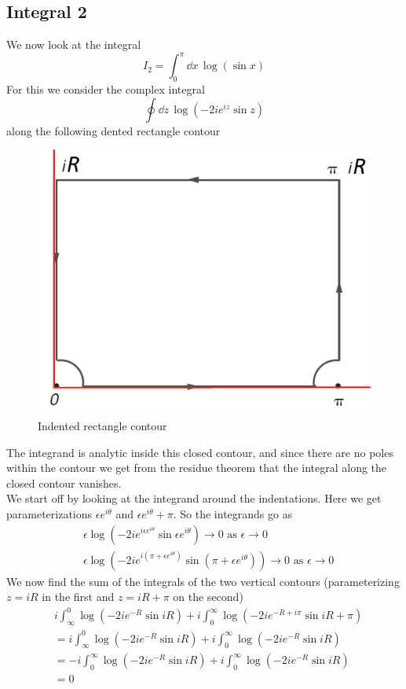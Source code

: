 \documentclass[a4paper,12pt]{article}
\begin{document}
\subsection*{Integral 2}
We now look at the integral
\begin{equation}
I_2=\int_{0}^{\pi}\dd x\,\log(\sin x)
\end{equation}
For this we consider the complex integral 
\begin{equation}
\oint \dd z\,\log(-2ie^{iz}\sin z)
\end{equation}
along the following dented rectangle contour
\begin{figure}[H]
	\centering
	\includegraphics[width=0.5\linewidth]{rectangle}
	\caption{Indented rectangle contour}
	\label{fig:rectangle}
\end{figure}
The integrand is analytic inside this closed contour, and since there are no poles within the contour we get from the residue theorem that the integral along the closed contour vanishes. \\
We start off by looking at the integrand around the indentations. Here we get parameterizations $\epsilon e^{i\theta}$ and $\epsilon e^{i\theta}+\pi$. So the integrands go as
\begin{equation}
\begin{aligned}
&\epsilon \log(-2ie^{i\epsilon e^{i\theta}}\sin {\epsilon e^{i\theta}})\to 0\text{ as } \epsilon \to 0\\
&\epsilon \log(-2ie^{i (\pi +\epsilon e^{i\theta})}\sin {(\pi +\epsilon e^{i\theta})})\to 0\text{ as } \epsilon \to 0
\end{aligned}
\end{equation}
We now find the sum of the integrals of the two vertical contours (parameterizing $z=iR$ in the first and $z=iR+\pi$ on the second)
\begin{equation}
\begin{aligned}
&i\int_{\infty}^{0}\log(-2ie^{-R}\sin iR)+i\int_{0}^{\infty}\log(-2ie^{-R+i\pi}\sin iR+\pi)\\
&=i\int_{\infty}^{0}\log(-2ie^{-R}\sin iR)+i\int_{0}^{\infty}\log(-2ie^{-R}\sin iR)\\
&=
-i\int^{\infty}_{0}\log(-2ie^{-R}\sin iR)+i\int_{0}^{\infty}\log(-2ie^{-R}\sin iR)\\
&=0
\end{aligned}
\end{equation}
\end{document}
